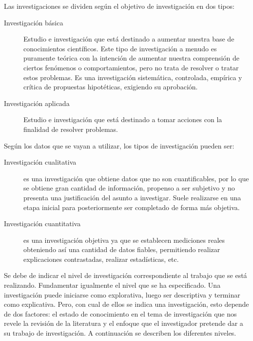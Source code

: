 Las investigaciones se dividen según el objetivo de investigación en dos tipos:\newline

\begin{description}

    \item[Investigación básica] Estudio e investigación que está destinado a aumentar nuestra base de conocimientos científicos. Este tipo de investigación a menudo es puramente teórica con la intención de aumentar nuestra comprensión de ciertos fenómenos o comportamientos, pero no trata de resolver o tratar estos problemas. Es una investigación sistemática, controlada, empírica y crítica de propuestas hipotéticas, exigiendo su aprobación.
    
    \item[Investigación aplicada] Estudio e investigación que está destinado a tomar acciones  con la finalidad de resolver problemas.
    
\end{description}

Según los datos que se vayan a utilizar, los tipos de investigación pueden ser:

\begin{description}

    \item[Investigación cualitativa] es una investigación que obtiene datos que no son cuantificables, por lo que se obtiene gran cantidad de información, propenso a ser subjetivo y no presenta una justificación del asunto a investigar. Suele realizarse en una etapa inicial para posteriormente ser completado de forma más objetiva.
    
    \item[Investigación cuantitativa] es una investigación objetiva ya que se establecen mediciones reales obteniendo así una cantidad de datos fiables, permitiendo realizar explicaciones contrastadas, realizar estadísticas, etc.

\end{description}

Se debe de indicar el nivel de investigación correspondiente al trabajo que se está realizando. Fundamentar igualmente el nivel que se ha especificado. Una investigación puede iniciarse como explorativa, luego ser descriptiva y terminar como explicativa. Pero, con cual de ellos se indica una investigación, esto depende de dos factores: el estado de conocimiento en el tema de investigación que nos revele la revisión de la literatura y el enfoque que el investigador pretende dar a su trabajo de investigación.  A continuación se describen los diferentes niveles.\newline

